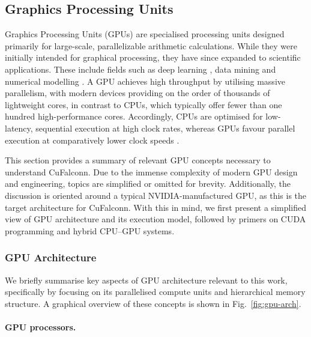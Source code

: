 \documentclass{article}
\newcommand{\cf}{CuFalconn\xspace}
\begin{document}
\subsection{Graphics Processing Units}
\label{sec:gpus}

Graphics Processing Units (GPUs) are specialised processing units designed primarily for large-scale, parallelizable arithmetic calculations. While they were initially intended for graphical processing, they have since expanded to scientific applications. These include fields such as deep learning \cite{buber2018performance,jeon2021deep}, data mining \cite{fang2008parallel,cano2018survey} and numerical modelling \cite{michalakes2008gpu,gan2016gpu,hou2020gpu}. A GPU achieves high throughput by utilising massive parallelism, with modern devices providing on the order of thousands of lightweight cores, in contrast to CPUs, which typically offer fewer than one hundred high-performance cores. Accordingly, CPUs are optimised for low-latency, sequential execution at high clock rates, whereas GPUs favour parallel execution at comparatively lower clock speeds \cite{intel_cpu_gpu}. 

This section provides a summary of relevant GPU concepts necessary to understand \cf. Due to the immense complexity of modern GPU design and engineering, topics are simplified or omitted for brevity. Additionally, the discussion is oriented around a typical NVIDIA-manufactured GPU, as this is the target architecture for \cf. With this in mind, we first present a simplified view of GPU architecture and its execution model, followed by primers on CUDA programming and hybrid CPU–GPU systems.

\subsubsection{GPU Architecture}

We briefly summarise key aspects of GPU architecture relevant to this work, specifically by focusing on its parallelised compute units and hierarchical memory structure. A graphical overview of these concepts is shown in Fig.~\ref{fig:gpu-arch}.

\paragraph{GPU processors.}
\end{document}
